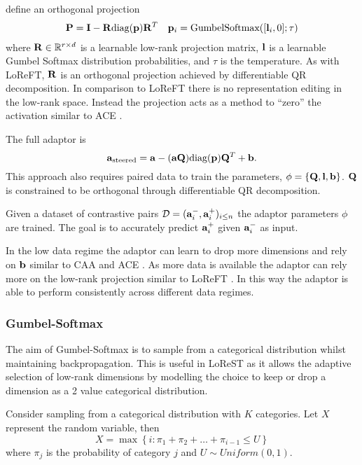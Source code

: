 \citet{steering-clear} define an orthogonal projection
\begin{align*}
    \mathbf{P} = \mathbf{I} - \mathbf{R}\text{diag}(\mathbf{p})\mathbf{R}^T && \mathbf{p}_i = \text{GumbelSoftmax}([\mathbf{l}_i,0];\tau)
\end{align*}
where $\mathbf{R} \in \mathbb{R}^{r\times d}$ is a learnable low-rank projection matrix, $\mathbf{l}$ is a learnable Gumbel Softmax distribution probabilities, and $\tau$ is the temperature.
As with LoReFT, $\mathbf{R}$ is an orthogonal projection achieved by differentiable QR decomposition.
In comparison to LoReFT  there is no representation editing in the low-rank space.
Instead the projection acts as a method to ``zero'' the activation similar to ACE \citep{ace}.

The full adaptor is
\begin{equation}
    \mathbf{a}_\text{steered} = \mathbf{a} - (\mathbf{a}\mathbf{Q})\text{diag}(\mathbf{p})\mathbf{Q}^T + \mathbf{b}.
\end{equation}
This approach also requires paired data to train the parameters, $\phi = \{\mathbf{Q}, \mathbf{l}, \mathbf{b}\}$.
$\mathbf{Q}$ is constrained to be orthogonal through differentiable QR decomposition.

Given a dataset of contrastive pairs $\mathcal{D} = (\mathbf{a}_i^-, \mathbf{a}_i^+)_{i\le n}$ the adaptor parameters $\phi$ are trained.
The goal is to accurately predict $\mathbf{a}_i^+$ given $\mathbf{a}_i^-$ as input.

In the low data regime the adaptor can learn to drop more dimensions and rely on $\mathbf{b}$ similar to CAA \citep{caa} and ACE \citep{ace}.
As more data is available the adaptor can rely more on the low-rank projection similar to LoReFT \citep{reft}.
In this way the adaptor is able to perform consistently across different data regimes.

\subsubsection{Gumbel-Softmax}

The aim of Gumbel-Softmax is to sample from a categorical distribution whilst maintaining backpropagation.
This is useful in LoReST as it allows the adaptive selection of low-rank dimensions by modelling the choice to keep or drop a dimension as a 2 value categorical distribution.

Consider sampling from a categorical distribution with $K$ categories.
Let $X$ represent the random variable, then
\begin{equation*}
    X = \max\left\{i : \pi_1 + \pi_2 + \dots + \pi_{i-1} \le U\right\}
\end{equation*}
where $\pi_j$ is the probability of category $j$ and $U \sim Uniform(0,1)$.

